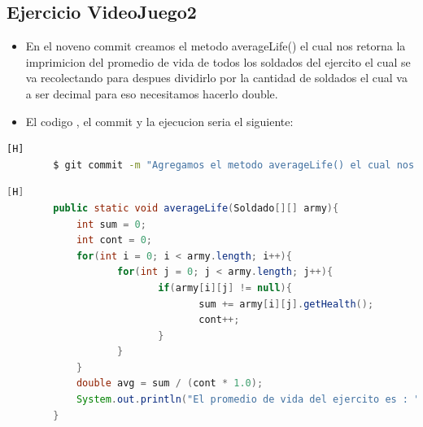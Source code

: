 \documentclass{article}
\begin{document}
	\subsection{Ejercicio VideoJuego2}
	\begin{itemize}	
		\item En el noveno commit creamos el metodo averageLife() el cual nos retorna la imprimicion del promedio de vida de todos los soldados del ejercito el cual se va recolectando para despues dividirlo por la cantidad de soldados el cual va a ser decimal para eso necesitamos hacerlo double.
		\item El codigo , el commit y la ejecucion seria el siguiente:
	\end{itemize}	
	\begin{lstlisting}[language=bash,caption={Commit}][H]
		$ git commit -m "Agregamos el metodo averageLife() el cual nos dara el promedio de vida del ejercito el cual recolecteria la vida de todos y despues se dividiria en la cantidad de soldados el cual lo multiplicamos por 1.0 para que este sea double decimal y sea mas especifico y despues se imprimiria este resultado"
	\end{lstlisting}	
	\begin{lstlisting}[language=java,caption={Las lineas de codigos del metodo creado:}][H]
		public static void averageLife(Soldado[][] army){
			int sum = 0;
			int cont = 0;
			for(int i = 0; i < army.length; i++){
				   for(int j = 0; j < army.length; j++){
						  if(army[i][j] != null){
								 sum += army[i][j].getHealth();
								 cont++;
						  }
				   }
			}
			double avg = sum / (cont * 1.0);
			System.out.println("El promedio de vida del ejercito es : " + avg);
	   	}
	\end{lstlisting}
\end{document}
